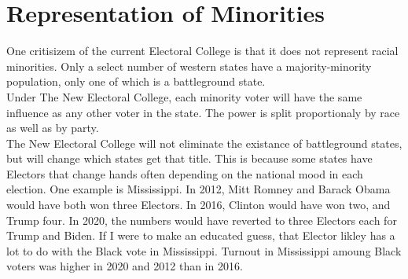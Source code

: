 \documentclass{article}
\begin{document}
    \section{Representation of Minorities}

    One critisizem of the current Electoral College is that it does not represent racial minorities. Only a select number of western states have a majority-minority population, only one of which is a battleground state.\\

    Under The New Electoral College, each minority voter will have the same influence as any other voter in the state. The power is split proportionaly by race as well as by party.\\

    The New Electoral College will not eliminate the existance of battleground states, but will change which states get that title. This is because some states have Electors that change hands often depending on the national mood in each election. One example is Mississippi. In 2012, Mitt Romney and Barack Obama would have both won three Electors. In 2016, Clinton would have won two, and Trump four. In 2020, the numbers would have reverted to three Electors each for Trump and Biden. If I were to make an educated guess, that Elector likley has a lot to do with the Black vote in Mississippi. Turnout in Mississippi amoung Black voters was higher in 2020 and 2012 than in 2016.\\
\end{document}
